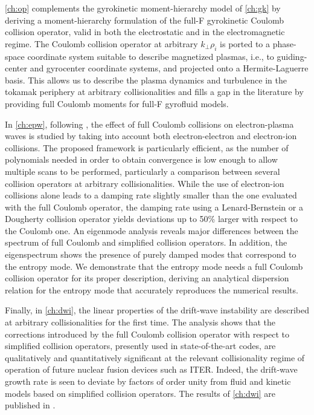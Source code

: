 \cref{ch:op} complements the gyrokinetic moment-hierarchy model of \cref{ch:gk} by deriving a moment-hierarchy formulation of the full-F gyrokinetic Coulomb collision operator, valid in both the electrostatic and in the electromagnetic regime.
%
The Coulomb collision operator at arbitrary $k_\perp \rho_i$ is ported to a phase-space coordinate system suitable to describe magnetized plasmas, i.e., to guiding-center and gyrocenter coordinate systems, and projected onto a Hermite-Laguerre basis.
%
This allows us to describe the plasma dynamics and turbulence in the tokamak periphery at arbitrary collisionalities and fills a gap in the literature by providing full Coulomb moments for full-F gyrofluid models.


In \cref{ch:epw}, following \citet{Jorge2018a}, the effect of full Coulomb collisions on electron-plasma waves is studied by taking into account both electron-electron and electron-ion collisions.
%
The proposed framework is particularly efficient, as the number of polynomials needed in order to obtain convergence is low enough to allow multiple scans to be performed, particularly a comparison between several collision operators at arbitrary collisionalities.
%
While the use of electron-ion collisions {alone} leads to a damping rate slightly smaller than the one evaluated with the full Coulomb operator, the damping rate using a Lenard-Bernstein or a Dougherty collision operator yields deviations up to 50\% larger with respect to the Coulomb one.
%
An eigenmode analysis reveals major differences between the spectrum of full Coulomb and simplified collision operators.
%
In addition, the eigenspectrum shows the presence of purely damped modes that correspond to the entropy mode.
%
We demonstrate that the entropy mode needs a full Coulomb collision operator for its proper description, deriving an analytical dispersion relation for the entropy mode that accurately reproduces the numerical results.

Finally, in \cref{ch:dwi}, the linear properties of the drift-wave instability are described at arbitrary collisionalities for the first time.
%
The analysis shows that the corrections introduced by the full Coulomb collision operator with respect to simplified collision operators, presently used in state-of-the-art codes, are qualitatively and quantitatively significant at the relevant collisionality regime of operation of future nuclear fusion devices such as ITER.
%
Indeed, the drift-wave growth rate is seen to deviate by factors of order unity from fluid and kinetic models based on simplified collision operators. 
%
The results of \cref{ch:dwi} are published in \citet{Jorge2018}.

